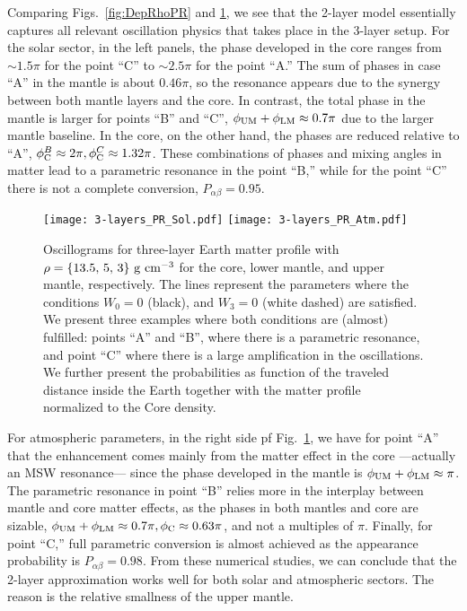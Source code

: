 Comparing Figs.~\ref{fig:DepRhoPR} and \ref{fig:DepRhoPR3l}, we see that the 2-layer model essentially captures all relevant oscillation physics that takes place in the 3-layer setup.
For the solar sector, in the left panels, the phase developed in the core ranges from $\sim 1.5\pi$ for the point ``C'' to $\sim 2.5\pi$ for the point ``A.''
The sum of phases in case ``A'' in the mantle is about $0.46\pi$, so the resonance appears due to the synergy between both mantle layers and the core. 
In contrast, the total phase in the mantle is larger for points ``B'' and ``C'', $\phi_{\rm UM}+\phi_{\rm LM}\approx 0.7\pi$ due to the larger mantle baseline.
In the core, on the other hand, the phases are reduced relative to ``A'', $\phi_{\rm C}^B\approx 2\pi, \phi_{\rm C}^C\approx 1.32\pi$.
These combinations of phases and mixing angles in matter lead to a parametric resonance in the point ``B,'' while for the point ``C'' there is not a complete conversion, $P_{\alpha\beta} = 0.95$.
\begin{figure}[t]
\begin{center}
\texttt{[image: 3-layers\_PR\_Sol.pdf]}
\texttt{[image: 3-layers\_PR\_Atm.pdf]}
\caption{Oscillograms for three-layer Earth matter profile with $\rho=\{13.5,\,5,\,3\}~{\rm g\ cm^{-3}}$ for the core, lower mantle, and upper mantle, respectively. The lines represent the parameters where the conditions $W_0=0$ (black), and $W_3=0$ (white dashed) are satisfied. We present three examples where both conditions are (almost) fulfilled: points ``A'' and ``B'', where there is a parametric resonance, and point ``C'' where there is a large amplification in the oscillations. We further present the probabilities as function of the traveled distance inside the Earth together with the matter profile normalized to the Core density. \label{fig:DepRhoPR3l}}
\end{center}
\end{figure}

For atmospheric parameters, in the right side pf Fig.~\ref{fig:DepRhoPR3l}, we have for point ``A'' that the enhancement comes mainly from the matter effect in the core ---actually an MSW resonance--- since the phase developed in the mantle is $\phi_{\rm UM}+\phi_{\rm LM}\approx\pi$. 
The parametric resonance in point ``B'' relies more in the interplay between mantle and core matter effects, as the phases in both mantles and core are sizable, $\phi_{\rm UM}+\phi_{\rm LM}\approx0.7\pi, \phi_{\rm C}\approx 0.63\pi$, and not a multiples of $\pi$. 
Finally, for point ``C,'' full parametric conversion is almost achieved as the appearance probability is $P_{\alpha\beta} = 0.98$. 
From these numerical studies, we can conclude that the  2-layer approximation works well for both solar and atmospheric sectors.
The reason is the relative smallness of the upper mantle.

